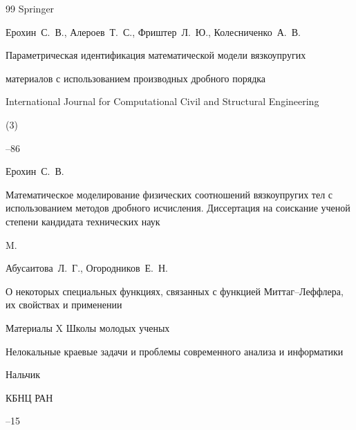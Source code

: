 \documentclass[11pt,a4paper,twoside]{article}
\begin{document}
\begin{thebibliography}{99}
\publ  Springer











\by Ерохин~С.~В., Алероев~Т.~С., Фриштер~Л.~Ю., Колесниченко~А.~В.


\paper Параметрическая идентификация математической модели вязкоупругих


материалов с использованием производных дробного порядка


\jour International Journal for Computational Civil and Structural Engineering




(3)


--86







\by Ерохин~С.~В.


\book Математическое моделирование физических соотношений вязкоупругих тел с использованием методов дробного исчисления. Диссертация на соискание ученой степени кандидата технических наук


\publaddr M.









 










\by Абусаитова~Л.~Г., Огородников~Е.~Н.


\paper О некоторых специальных функциях, связанных с функцией Миттаг--Леффлера, их свойствах и применении


\bookinfo Материалы X Школы молодых ученых 


\inbook Нелокальные краевые задачи и проблемы современного анализа и информатики


\publaddr Нальчик


\publ  КБНЦ РАН




--15






\end{thebibliography}
\end{document}
